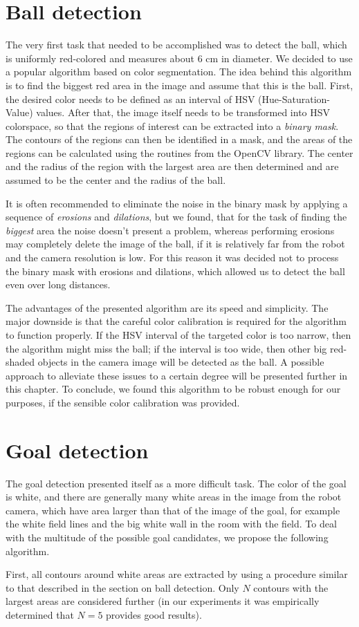 \section{Ball detection}

The very first task that needed to be accomplished was to detect the ball,
which is uniformly red-colored and measures about 6 cm in diameter. We decided
to use a popular algorithm based on color segmentation. The idea behind this
algorithm is to find the biggest red area in the image and assume that this is
the ball. First, the desired color needs to be defined as an interval of HSV
(Hue-Saturation-Value) values. After that, the image itself needs to be
transformed into HSV colorspace, so that the regions of interest can be
extracted into a \textit{binary mask}. The contours of the regions can then be
identified in a mask, and the areas of the regions can be calculated using the
routines from the OpenCV library. The center and the radius of the region with
the largest area are then determined and are assumed to be the center and the
radius of the ball.

It is often recommended to eliminate the noise in the binary mask by applying a
sequence of \textit{erosions} and \textit{dilations}, but we found, that for
the task of finding the \textit{biggest} area the noise doesn't present a
problem, whereas performing erosions may completely delete the image of the
ball, if it is relatively far from the robot and the camera resolution is low.
For this reason it was decided not to process the binary mask with erosions and
dilations, which allowed us to detect the ball even over long distances.

The advantages of the presented algorithm are its speed and simplicity. The
major downside is that the careful color calibration is required for the
algorithm to function properly. If the HSV interval of the targeted color is
too narrow, then the algorithm might miss the ball; if the interval is too
wide, then other big red-shaded objects in the camera image will be detected as
the ball. A possible approach to alleviate these issues to a certain degree
will be presented further in this chapter. To conclude, we found this algorithm
to be robust enough for our purposes, if the sensible color calibration was
provided.

\section{Goal detection}

The goal detection presented itself as a more difficult task. The color of the
goal is white, and there are generally many white areas in the image from the
robot camera, which have area larger than that of the image of the goal, for
example the white field lines and the big white wall in the room with the
field. To deal with the multitude of the possible goal candidates, we
propose the following algorithm.

First, all contours around white areas are extracted by using a procedure
similar to that described in the section on ball detection. Only $N$ contours
with the largest areas are considered further (in our experiments it was
empirically determined that $N=5$ provides good results).
